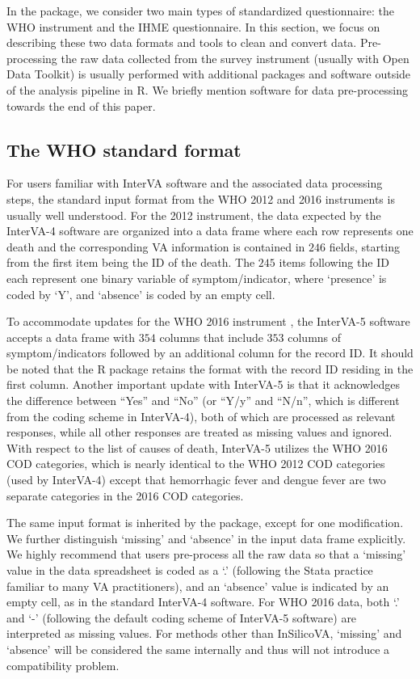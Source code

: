 In the  package, we consider two main types of
standardized questionnaire: the WHO instrument and the IHME
questionnaire. In this section, we focus on describing these two data
formats and tools to clean and convert data. Pre-processing the raw data
collected from the survey instrument (usually with Open Data Toolkit) is
usually performed with additional packages and software outside of the
analysis pipeline in R. We briefly mention software for data
pre-processing towards the end of this paper.

\hypertarget{the-who-standard-format}{%
\subsection{The WHO standard format}\label{the-who-standard-format}}

For users familiar with InterVA software and the associated data
processing steps, the standard input format from the WHO 2012 and 2016
instruments is usually well understood. For the 2012 instrument, the
data expected by the InterVA-4 software are organized into a data frame
where each row represents one death and the corresponding VA information
is contained in \(246\) fields, starting from the first item being the
ID of the death. The \(245\) items following the ID each represent one
binary variable of symptom/indicator, where `presence' is coded by `Y',
and `absence' is coded by an empty cell.

To accommodate updates for the WHO 2016 instrument
\citep{dambruoso2017}, the InterVA-5 software accepts a data frame with
\(354\) columns that include \(353\) columns of symptom/indicators
followed by an additional column for the record ID. It should be noted
that the R package  retains the format with the record
ID residing in the first column. Another important update with InterVA-5
is that it acknowledges the difference between ``Yes'' and ``No'' (or
``Y/y'' and ``N/n'', which is different from the coding scheme in
InterVA-4), both of which are processed as relevant responses, while all
other responses are treated as missing values and ignored. With respect
to the list of causes of death, InterVA-5 utilizes the WHO 2016 COD
categories, which is nearly identical to the WHO 2012 COD categories
(used by InterVA-4) except that hemorrhagic fever and dengue fever are
two separate categories in the 2016 COD categories.

The same input format is inherited by the  package,
except for one modification. We further distinguish `missing' and
`absence' in the input data frame explicitly. We highly recommend that
users pre-process all the raw data so that a `missing' value in the data
spreadsheet is coded as a `.' (following the Stata practice familiar to
many VA practitioners), and an `absence' value is indicated by an empty
cell, as in the standard InterVA-4 software. For WHO 2016 data, both `.'
and `-' (following the default coding scheme of InterVA-5 software) are
interpreted as missing values. For methods other than InSilicoVA,
`missing' and `absence' will be considered the same internally and thus
will not introduce a compatibility problem.


